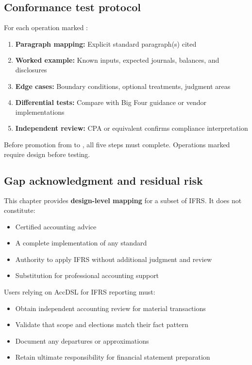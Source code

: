 \subsection{Conformance test protocol}

For each operation marked :
\begin{enumerate}
\item \textbf{Paragraph mapping:} Explicit standard paragraph(s) cited
\item \textbf{Worked example:} Known inputs, expected journals, balances, and disclosures
\item \textbf{Edge cases:} Boundary conditions, optional treatments, judgment areas
\item \textbf{Differential tests:} Compare with Big Four guidance or vendor implementations
\item \textbf{Independent review:} CPA or equivalent confirms compliance interpretation
\end{enumerate}

Before promotion from  to , all five steps
must complete. Operations marked  require design before testing.

\subsection{Gap acknowledgment and residual risk}

This chapter provides \textbf{design-level mapping} for a subset of IFRS. It does
not constitute:
\begin{itemize}
\item Certified accounting advice
\item A complete implementation of any standard
\item Authority to apply IFRS without additional judgment and review
\item Substitution for professional accounting support
\end{itemize}

Users relying on AccDSL for IFRS reporting must:
\begin{itemize}
\item Obtain independent accounting review for material transactions
\item Validate that scope and elections match their fact pattern
\item Document any departures or approximations
\item Retain ultimate responsibility for financial statement preparation
\end{itemize}
